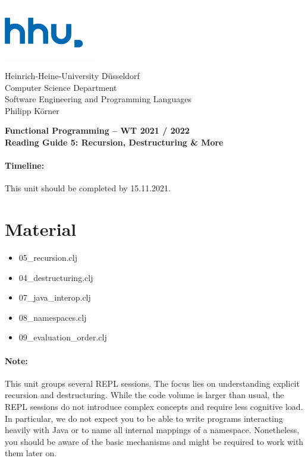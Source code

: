 \documentclass[11pt,a4paper]{article}
\begin{document}
	
	\begin{minipage}[b]{\textwidth}
		\parbox[t]{5cm}{%
			\includegraphics[width=4cm]{unilogo}
			\hfill
		}
		\parbox[b]{11cm}{%
			Heinrich-Heine-University D\"usseldorf\\
			Computer Science Department\\
			Software Engineering and Programming Languages\\
			Philipp K\"orner
		}
	\end{minipage}
\begin{center}
	\bf
	Functional Programming -- WT 2021 / 2022\\
    Reading Guide 5: Recursion, Destructuring \& More
\end{center}

\pagestyle{empty}

\paragraph{Timeline:} This unit should be completed by 15.11.2021.

\section{Material} 

\begin{itemize}
\item 05\_recursion.clj 
\item 04\_destructuring.clj
\item 07\_java\_interop.clj
\item 08\_namespaces.clj
\item 09\_evaluation\_order.clj
\end{itemize}

\paragraph{Note:} This unit groups several REPL sessions.
The focus lies on understanding explicit recursion and destructuring.
While the code volume is larger than usual,
the REPL sessions do not introduce complex concepts
and require less cognitive load.
In particular, we do not expect you to be able to write programs interacting heavily with Java
or to name all internal mappings of a namespace.
Nonetheless, you should be aware of the basic mechanisms
and might be required to work with them later on.
\end{document}
